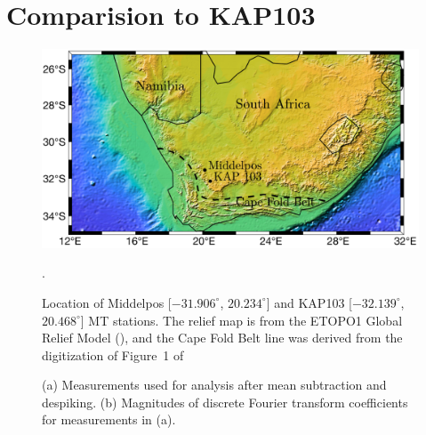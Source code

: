 \documentclass[draft,linenumbers]{agujournal2018}
\begin{document}
\clearpage

\section{Comparision to KAP103}

\begin{figure}[h]
\centering
\includegraphics[width=\textwidth]{figures/map.pdf}
\caption{Location of Middelpos [$-31.906^\circ$, $20.234^\circ$] and KAP103 [$-32.139^\circ$, $20.468^\circ$] MT stations. The relief map is from the ETOPO1 Global Relief Model (\cite{NCEI2006}), and the Cape Fold Belt line was derived from the digitization of Figure~1 of \cite{Nguuri2001}}.
\label{fig:map}
\end{figure}

\begin{figure}[h]
     \hspace{10pt}
     \caption{(a) Measurements used for analysis after mean subtraction and despiking. (b) Magnitudes of discrete Fourier transform coefficients for measurements in (a).}
  \label{fig:timeseries}
\end{figure}
\end{document}
